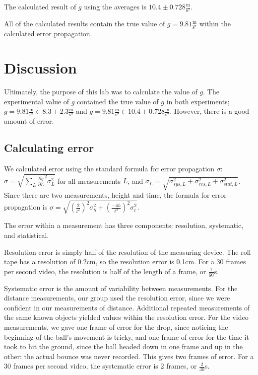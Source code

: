 \documentclass[12pt]{article}
\begin{document}
The calculated result of \(g\) using the averages is \(10.4\pm 0.728 \frac{\text{m}}{\text{s}^{2}}\).

All of the calculated results contain the true value of \(g = 9.81 \frac{\text{m}}{\text{s}^{2}}\) within the calculated error propagation.
\section{Discussion}
\label{sec:orgfbdafb0}

Ultimately, the purpose of this lab was to calculate the value of \(g\). The experimental value of \(g\) contained the true value of \(g\) in both experiments; \(g = 9.81 \frac{\text{m}}{\text{s}^{2}} \in 8.3\pm2.3 \frac{\text{m}}{\text{s}^{2}}\) and \(g = 9.81 \frac{\text{m}}{\text{s}^{2}} \in 10.4\pm 0.728 \frac{\text{m}}{\text{s}^{2}}\). However, there is a good amount of error.
\subsection{Calculating error}
\label{sec:org36114d8}

We calculated error using the standard formula for error propagation \(\sigma\): \(\sigma = \sqrt{\sum_{L} \frac{\partial g}{\partial L}^{2}\sigma_{L}^{2}}\) for all measurements \(L\), and \(\sigma_{L}=\sqrt{\sigma_{sys,L}^{2}+\sigma_{res,L}^{2}+\sigma_{stat,L}^{2}}\). Since there are two measurements, height and time, the formula for error propagation is \(\sigma = \sqrt{ \left( \frac{2}{t^{2}} \right) ^{2} \sigma_{h}^{2} + \left( \frac{-4h}{t^{3}} \right)^{2}\sigma_{t}^{2} }\).

The error within a measurement has three components: resolution, systematic, and statistical.

Resolution error is simply half of the resolution of the measuring device. The roll tape has a resolution of 0.2cm, so the resolution error is 0.1cm. For a 30 frames per second video, the resolution is half of the length of a frame, or \(\frac{1}{60}\)s.

Systematic error is the amount of variability between measurements. For the distance measurements, our group used the resolution error, since we were confident in our measurements of distance. Additional repeated measurements of the same known objects yielded values within the resolution error. For the video measurements, we gave one frame of error for the drop, since noticing the beginning of the ball's movement is tricky, and one frame of error for the time it took to hit the ground, since the ball headed down in one frame and up in the other: the actual bounce was never recorded. This gives two frames of error. For a 30 frames per second video, the systematic error is 2 frames, or \(\frac{2}{30}\)s.
\end{document}
